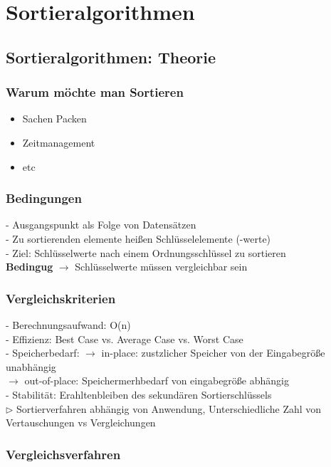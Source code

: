 \newpage
\section{Sortieralgorithmen}
	\subsection{Sortieralgorithmen: Theorie}
		\subsubsection{Warum möchte man Sortieren}
			\begin{itemize}
				\item Sachen Packen
				\item Zeitmanagement
				\item etc
			\end{itemize}
		
		
		\subsubsection{Bedingungen}
			- Ausgangspunkt als Folge von Datensätzen \\
			- Zu sortierenden elemente hei\ss en Schlüsselelemente (-werte) \\
			- Ziel: Schlüsselwerte nach einem Ordnungsschlüssel zu sortieren \\
			\textbf{Bedingug} $\rightarrow$ Schlüsselwerte müssen vergleichbar sein
		
		
		\subsubsection{Vergleichskriterien}
			- Berechnungsaufwand: O(n) \\
			- Effizienz: Best Case vs. Average Case vs. Worst Case \\ 
			- Speicherbedarf:
			$\rightarrow$ in-place: zustzlicher Speicher von der Eingabegrö\ss e unabhängig \\
			$\rightarrow$ out-of-place: Speichermerhbedarf von eingabegrö\ss e abhängig \\
			- Stabilität: Erahltenbleiben des sekundären Sortierschlüssels \\
		
			$\rhd$ Sortierverfahren abhängig von Anwendung, Unterschiedliche Zahl von Vertauschungen vs Vergleichungen 
		
		
		\subsubsection{Vergleichsverfahren}
